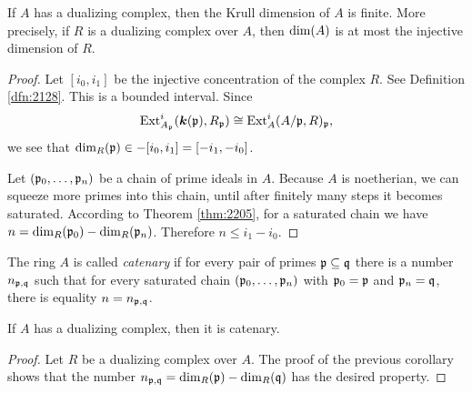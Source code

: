 \begin{cor} \label{cor:2235}
If $A$ has a dualizing complex, then the Krull dimension of $A$ is finite. 
More precisely, if $R$ is a dualizing complex over $A$, then 
$\operatorname{dim}(A)$ is at most the injective dimension of $R$. 
\end{cor}

\begin{proof}
Let $[i_0, i_1]$ be the injective concentration of the complex $R$. See 
Definition \ref{dfn:2128}. This is a bounded interval. Since 
\[ \operatorname{Ext}^i_{A_{\mathfrak{p}}}(\boldsymbol{k}(\mathfrak{p}), R_{\mathfrak{p}}) \cong
\operatorname{Ext}^i_{A}(A / \mathfrak{p}, R)_{\mathfrak{p}} ,  \]
we see that 
$\operatorname{dim}_{R}(\mathfrak{p}) \in -[i_0, i_1] = [-i_1, -i_0]$. 

Let $(\mathfrak{p}_0, \ldots, \mathfrak{p}_n)$ be a chain of prime ideals in $A$. Because $A$ is 
noetherian, we can squeeze more primes into this chain, until after finitely 
many steps it becomes saturated. According to Theorem \ref{thm:2205}, for a 
saturated chain we have 
$n = \operatorname{dim}_{R}(\mathfrak{p}_0) - \operatorname{dim}_{R}(\mathfrak{p}_n)$.
Therefore $n \leq i_1 - i_0$. 
\end{proof}

\begin{dfn} \label{dfn:2237}
The ring $A$ is called {\em catenary} if for every pair of primes 
$\mathfrak{p} \subseteq \mathfrak{q}$ there is a number $n_{\mathfrak{p}, \mathfrak{q}}$ such that for every saturated chain 
$(\mathfrak{p}_0, \ldots, \mathfrak{p}_n)$ with $\mathfrak{p}_0 = \mathfrak{p}$ and $\mathfrak{p}_n = \mathfrak{q}$, there is equality
$n = n_{\mathfrak{p}, \mathfrak{q}}$. 
\end{dfn}

\begin{cor} \label{cor:2236}
If $A$ has a dualizing complex, then it is catenary.
\end{cor}

\begin{proof}
Let $R$ be a dualizing complex over $A$. The proof of the previous corollary 
shows that the number 
$n_{\mathfrak{p}, \mathfrak{q}}= \operatorname{dim}_{R}(\mathfrak{p}) - \operatorname{dim}_{R}(\mathfrak{q})$
has the desired property. 
\end{proof}

